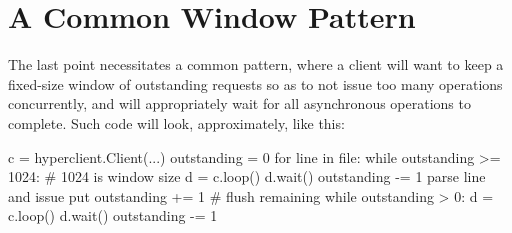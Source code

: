 \section{A Common Window Pattern}
\label{sec:async-ops:window}

The last point necessitates a common pattern, where a client will want to keep a
fixed-size window of outstanding requests so as to not issue too many operations
concurrently, and will appropriately wait for all asynchronous operations to
complete. Such code will look, approximately, like this:

 \begin{pythoncode}
c = hyperclient.Client(...)
outstanding = 0
for line in file:
    while outstanding >= 1024: # 1024 is window size
        d = c.loop()
        d.wait()
        outstanding -= 1
    parse line and issue put
    outstanding += 1
# flush remaining
while outstanding > 0:
    d = c.loop()
    d.wait()
    outstanding -= 1
\end{pythoncode}
